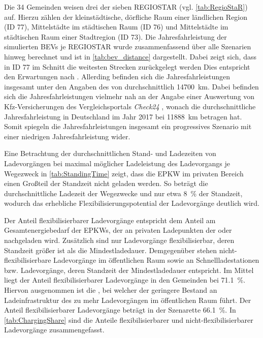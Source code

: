 Die \num{34} Gemeinden weisen drei der sieben \gls{REGIOSTAR} (vgl. \autoref{tab:RegioStaR}) auf.
Hierzu zählen der kleinstädtische, dörfliche Raum einer ländlichen Region (\gls{ID} \num{77}), Mittelstädte im städtischen Raum (\gls{ID} \num{76}) und Mittelstädte im städtischen Raum einer Stadtregion (\gls{ID} \num{73}).
Die Jahresfahrleistung der simulierten \glspl{BEV} je \gls{REGIOSTAR} wurde zusammenfassend über alle Szenarien hinweg berechnet und ist in \autoref{tab:bev_distance} dargestellt.
Dabei zeigt sich, dass in \gls{ID} \num{77} im Schnitt die weitesten Strecken zurückgelegt werden
Dies entspricht den Erwartungen nach  \cite{Nobis2019}.
Allerding befinden sich die Jahresfahrleistungen insgesamt unter den Angaben des  von durchschnittlich \SI{14700}{\km}.
Dabei befinden sich die Jahresfahrleistungen vielmehr nah an der Angabe einer Auswertung von Kfz-Versicherungen des Vergleichsportals \textit{Check24} \cite{CHECK24GmbH2018}, wonach die durchschnittliche Jahresfahrleistung in Deutschland im Jahr \num{2017} bei \SI{11888}{\km} betragen hat.
Somit spiegeln die Jahresfahrleistungen  insgesamt ein progressives Szenario mit einer niedrigen Jahresfahrleistung wider.




Eine Betrachtung der durchschnittlichen Stand- und Ladezeiten von Ladevorgängen bei maximal möglicher Ladeleistung des Ladevorgangs je Wegezweck in \autoref{tab:StandingTime} zeigt, dass die \gls{EPKW} im privaten Bereich einen Großteil der Standzeit nicht geladen werden.
So beträgt die durchschnittliche Ladezeit der Wegezwecke \nH und \Arbeit nur etwa \SI{8}{\percent} der Standzeit, wodurch das erhebliche Flexibilisierungspotential der Ladevorgänge deutlich wird.



Der Anteil flexibilisierbarer Ladevorgänge entspricht dem Anteil am Gesamtenergiebedarf der \glspl{EPKW}, der an privaten Ladepunkten der \UCs \zH oder \Firmeparkplatz nachgeladen wird.
Zusätzlich sind nur Ladevorgänge flexibilisierbar, deren Standzeit größer ist als die Mindestladedauer.
Demgegenüber stehen nicht-flexibilisierbare Ladevorgänge im öffentlichen Raum sowie an Schnellladestationen bzw. Ladevorgänge, deren Standzeit der Mindestladedauer entspricht.
Im Mittel liegt der Anteil flexibilisierbarer Ladevorgänge in den Gemeinden bei \SI{71.1}{\percent}.
Hiervon ausgenommen ist die \SzeFirmenparkplatzdot, bei welcher der geringere Bestand an Ladeinfrastruktur des \UC \Firmeparkplatz zu mehr Ladevorgängen im öffentlichen Raum führt.
Der Anteil flexibilisierbarer Ladevorgänge beträgt in der Szenarette \SI{66.1}{\percent}.
In \autoref{tab:ChargingShare} sind die Anteile flexibilisierbarer und nicht-flexibilisierbarer Ladevorgänge zusammengefasst.

